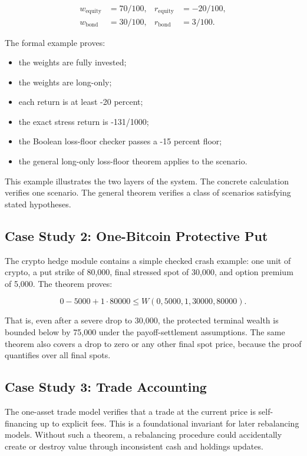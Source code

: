 \documentclass[11pt]{article}
\begin{document}
\begin{align*}
  w_{\mathrm{equity}} &= 70/100, &
  r_{\mathrm{equity}} &= -20/100,\\
  w_{\mathrm{bond}} &= 30/100, &
  r_{\mathrm{bond}} &= 3/100.
\end{align*}

The formal example proves:

\begin{itemize}
  \item the weights are fully invested;
  \item the weights are long-only;
  \item each return is at least -20 percent;
  \item the exact stress return is -131/1000;
  \item the Boolean loss-floor checker passes a -15 percent floor;
  \item the general long-only loss-floor theorem applies to the scenario.
\end{itemize}

This example illustrates the two layers of the system. The concrete
calculation verifies one scenario. The general theorem verifies a class of
scenarios satisfying stated hypotheses.

\subsection{Case Study 2: One-Bitcoin Protective Put}

The crypto hedge module contains a simple checked crash example: one unit of
crypto, a put strike of 80,000, final stressed spot of 30,000, and option
premium of 5,000. The theorem proves:

\[
  0 - 5000 + 1\cdot 80000
  \leq
  W(0,5000,1,30000,80000).
\]

That is, even after a severe drop to 30,000, the protected terminal wealth is
bounded below by 75,000 under the payoff-settlement assumptions. The same
theorem also covers a drop to zero or any other final spot price, because the
proof quantifies over all final spots.

\subsection{Case Study 3: Trade Accounting}

The one-asset trade model verifies that a trade at the current price is
self-financing up to explicit fees. This is a foundational invariant for later
rebalancing models. Without such a theorem, a rebalancing procedure could
accidentally create or destroy value through inconsistent cash and holdings
updates.
\end{document}
